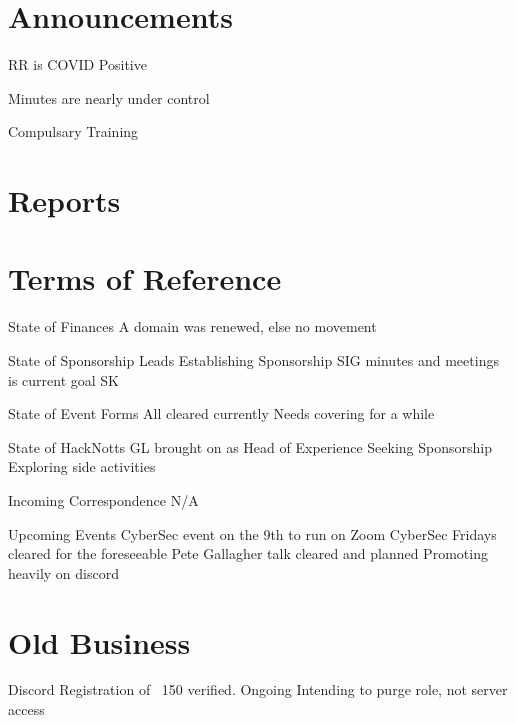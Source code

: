 \documentclass[11pt,hacksoc]{meetingmins}
\begin{document}
\maketitle

\section{Announcements}
\begin{items}
\item RR is COVID Positive
\item Minutes are nearly under control
\item Compulsary Training
\end{items}

\section{Reports}


\section{Terms of Reference}
\begin{items}
\item {State of Finances}
\subitem A domain was renewed, else no movement
\item {State of Sponsorship Leads}
\subitem Establishing Sponsorship SIG minutes and meetings is current goal SK
\item {State of Event Forms}
\subitem All cleared currently
\subitem Needs covering for a while
\item {State of HackNotts}
\subitem GL brought on as Head of Experience
\subitem Seeking Sponsorship
\subitem Exploring side activities
\item {Incoming Correspondence}
\subitem N/A
\item {Upcoming Events}
\subitem CyberSec event on the 9th to run on Zoom
\subitem CyberSec Fridays cleared for the foreseeable
\subitem Pete Gallagher talk cleared and planned
\subitem Promoting heavily on discord
\end{items}

\section{Old Business}
\begin{items}
\item Discord Registration
   of ~150 verified.
  \subitem Ongoing
  \subitem Intending to purge role, not server access
\end{items}
\end{document}
